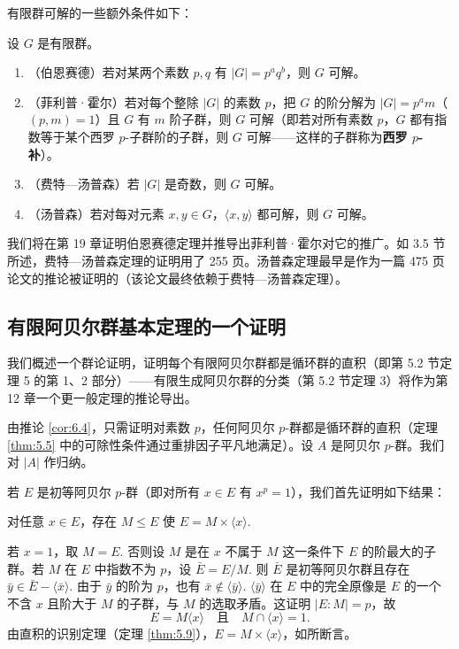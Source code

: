 有限群可解的一些额外条件如下：

\begin{theorem}\label{thm:6.11}
设 \(G\) 是有限群。

\begin{enumerate}[label=(\arabic*)]
\item （伯恩赛德）若对某两个素数 \(p, q\) 有 \(|G| = p^a q^b\)，则 \(G\) 可解。
\item （菲利普·霍尔）若对每个整除 \(|G|\) 的素数 \(p\)，把 \(G\) 的阶分解为 \(|G| = p^a m\)（\((p, m) = 1\)）且 \(G\) 有 \(m\) 阶子群，则 \(G\) 可解（即若对所有素数 \(p\)，\(G\) 都有指数等于某个西罗 \(p\)-子群阶的子群，则 \(G\) 可解——这样的子群称为\textbf{西罗 \(p\)-补}）。
\item （费特—汤普森）若 \(|G|\) 是奇数，则 \(G\) 可解。
\item （汤普森）若对每对元素 \(x, y \in G\)，\(\langle x, y \rangle\) 都可解，则 \(G\) 可解。
\end{enumerate}
\end{theorem}

我们将在第 19 章证明伯恩赛德定理并推导出菲利普·霍尔对它的推广。如 3.5 节所述，费特—汤普森定理的证明用了 255 页。汤普森定理最早是作为一篇 475 页论文的推论被证明的（该论文最终依赖于费特—汤普森定理）。

\subsection*{有限阿贝尔群基本定理的一个证明}

我们概述一个群论证明，证明每个有限阿贝尔群都是循环群的直积（即第 5.2 节定理 5 的第 1、2 部分）——有限生成阿贝尔群的分类（第 5.2 节定理 3）将作为第 12 章一个更一般定理的推论导出。

由推论 \ref{cor:6.4}，只需证明对素数 \(p\)，任何阿贝尔 \(p\)-群都是循环群的直积（定理 \ref{thm:5.5} 中的可除性条件通过重排因子平凡地满足）。设 \(A\) 是阿贝尔 \(p\)-群。我们对 \(|A|\) 作归纳。

若 \(E\) 是初等阿贝尔 \(p\)-群（即对所有 \(x \in E\) 有 \(x^p = 1\)），我们首先证明如下结果：
\begin{center}
对任意 \(x \in E\)，存在 \(M \leq E\) 使 \(E = M \times \langle x \rangle\).
\end{center}
若 \(x = 1\)，取 \(M = E\). 否则设 \(M\) 是在 \(x\) 不属于 \(M\) 这一条件下 \(E\) 的阶最大的子群。若 \(M\) 在 \(E\) 中指数不为 \(p\)，设 \(\bar{E} = E/M\). 则 \(\bar{E}\) 是初等阿贝尔群且存在 \(\bar{y} \in \bar{E} - \langle \bar{x} \rangle\). 由于 \(\bar{y}\) 的阶为 \(p\)，也有 \(\bar{x} \notin \langle \bar{y} \rangle\). \(\langle \bar{y} \rangle\) 在 \(E\) 中的完全原像是 \(E\) 的一个不含 \(x\) 且阶大于 \(M\) 的子群，与 \(M\) 的选取矛盾。这证明 \(|E : M| = p\)，故
\[
E = M\langle x \rangle \quad \text{且} \quad M \cap \langle x \rangle = 1.
\]
由直积的识别定理（定理 \ref{thm:5.9}），\(E = M \times \langle x \rangle\)，如所断言。

